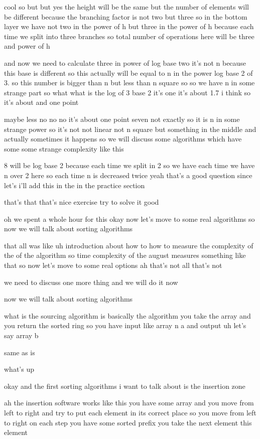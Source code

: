 cool so but but yes the height will be the same but the number of elements will be different because the branching factor is not two but three so in the bottom layer we have not two in the power of h but three in the power of h because each time we split into three branches so total number of operations here will be three and power of h

and now we need to calculate three in power of log base two it's not n because this base is different so this actually will be equal to n in the power log base 2 of 3. so this number is bigger than n but less than n square so so we have n in some strange part so what what is the log of 3 base 2 it's one it's about 1.7 i think so it's about and one point

maybe less no no no it's about one point seven not exactly so it is n in some strange power so it's not not linear not n square but something in the middle and actually sometimes it happens so we will discuss some algorithms which have some some strange complexity like this

8 will be log base 2 because each time we split in 2 so we have each time we have n over 2 here so each time n is decreased twice yeah that's a good question since let's i'll add this in the in the practice section

that's that that's nice exercise try to solve it good

oh we spent a whole hour for this okay now let's move to some real algorithms so now we will talk about sorting algorithms

that all was like uh introduction about how to how to measure the complexity of the of the algorithm so time complexity of the august measures something like that so now let's move to some real options ah that's not all that's not

we need to discuss one more thing and we will do it now

now we will talk about sorting algorithms

what is the sourcing algorithm is basically the algorithm you take the array and you return the sorted ring so you have input like array n a and output uh let's say array b

same as is

what's up

okay and the first sorting algorithms i want to talk about is the insertion zone

ah the insertion software works like this you have some array and you move from left to right and try to put each element in its correct place so you move from left to right on each step you have some sorted prefix you take the next element this element

